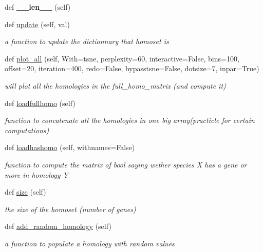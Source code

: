 \begin{DoxyCompactItemize}
def {\bfseries \+\_\+\+\_\+len\+\_\+\+\_\+} (self)
\item 
def \mbox{\hyperlink{class_py_c_u_b_1_1homoset_1_1_homo_set_a8cf76800f047841bf63d507fb1b54048}{update}} (self, val)
\begin{DoxyCompactList}\small\item\em a function to update the dictionnary that homoset is \end{DoxyCompactList}\item 
def \mbox{\hyperlink{class_py_c_u_b_1_1homoset_1_1_homo_set_af57de86adab3635645d684b89636cd5c}{plot\+\_\+all}} (self, With=\textquotesingle{}tsne\textquotesingle{}, perplexity=60, interactive=False, bins=100, offset=20, iteration=400, redo=False, bypasstsne=False, dotsize=7, inpar=True)
\begin{DoxyCompactList}\small\item\em will plot all the homologies in the full\+\_\+homo\+\_\+matrix (and compute it) \end{DoxyCompactList}\item 
def \mbox{\hyperlink{class_py_c_u_b_1_1homoset_1_1_homo_set_a5029dbdf4e7f61bd38b6273f4fde9ead}{loadfullhomo}} (self)
\begin{DoxyCompactList}\small\item\em function to concatenate all the homologies in one big array(practicle for certain computations) \end{DoxyCompactList}\item 
def \mbox{\hyperlink{class_py_c_u_b_1_1homoset_1_1_homo_set_a5a56a99b5bf87afb418a1bbc5ec1c10b}{loadhashomo}} (self, withnames=False)
\begin{DoxyCompactList}\small\item\em function to compute the matrix of bool saying wether species X has a gene or more in homology Y \end{DoxyCompactList}\item 
def \mbox{\hyperlink{class_py_c_u_b_1_1homoset_1_1_homo_set_a000511647e3f85d8abadcdddaddfb04d}{size}} (self)
\begin{DoxyCompactList}\small\item\em the size of the homoset (number of genes) \end{DoxyCompactList}\item 
def \mbox{\hyperlink{class_py_c_u_b_1_1homoset_1_1_homo_set_a05935a3f03f2e2b61b2f3e7e0222e2a9}{add\+\_\+random\+\_\+homology}} (self)
\begin{DoxyCompactList}\small\item\em a function to populate a homology with random values \end{DoxyCompactList}\item 

\end{DoxyCompactItemize}
